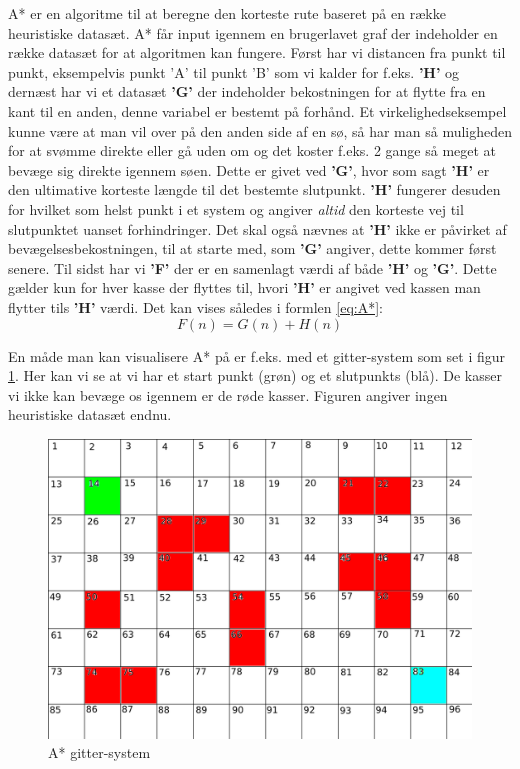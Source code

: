 A* er en algoritme til at beregne den korteste rute baseret på en række heuristiske datasæt. A* får input igennem en brugerlavet graf der indeholder en række datasæt for at algoritmen kan fungere.  Først har vi distancen fra punkt til punkt, eksempelvis punkt 'A' til punkt 'B' som vi kalder for f.eks. \textbf{'H'} og dernæst har vi et datasæt \textbf{'G'} der indeholder bekostningen for at flytte fra en kant til en anden, denne variabel er bestemt på forhånd. Et virkelighedseksempel kunne være at man vil over på den anden side af en sø, så har man så muligheden for at svømme direkte eller gå uden om og det koster f.eks. 2 gange så meget at bevæge sig direkte igennem søen. Dette er givet ved \textbf{'G'}, hvor som sagt \textbf{'H'} er den ultimative korteste længde til det bestemte slutpunkt. \textbf{'H'} fungerer desuden for hvilket som helst punkt i et system og angiver \textit{altid} den korteste vej til slutpunktet uanset forhindringer. Det skal også nævnes at \textbf{'H'} ikke er påvirket af bevægelsesbekostningen, til at starte med, som \textbf{'G'} angiver, dette kommer først senere. Til sidst har vi \textbf{'F'} der er en samenlagt værdi af både \textbf{'H'} og \textbf{'G'}. Dette gælder kun for hver kasse der flyttes til, hvori \textbf{'H'} er angivet ved kassen man flytter tils \textbf{'H'} værdi. Det kan vises således i formlen \ref{eq:A*}:
\begin{equation} \label{eq:A*}
F(n) = G(n) + H(n)
\end{equation}

En måde man kan visualisere A* på er f.eks. med et gitter-system som set i figur \ref{fig:AKvadrat1}. Her kan vi se at vi har et start punkt (grøn) og et slutpunkts (blå). De kasser vi ikke kan bevæge os igennem er de røde kasser. Figuren angiver ingen heuristiske datasæt endnu.

\begin{figure}[ht!]
\begin{adjustbox}{width=1.2\textwidth,center=\textwidth}
\centering
\includegraphics[width=1.2\textwidth]{Pictures/Teoriafsnit/Figurfiler/Grid2.png}
\end{adjustbox}
\label{fig:AKvadrat1}
\caption{A* gitter-system}
\end{figure}

